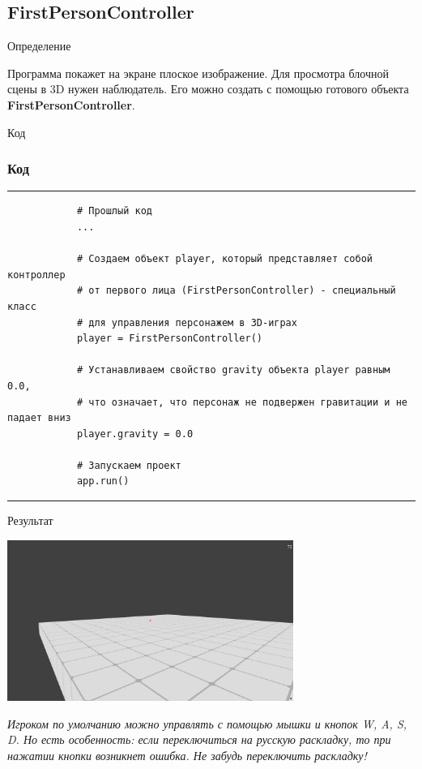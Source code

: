 \documentclass[handout]{beamer}
\begin{document}
    \subsection{FirstPersonController}
    \begin{frame}{Определение}
        \begin{justify}
            Программа покажет на экране плоское изображение. Для просмотра блочной сцены в 3D нужен наблюдатель. Его можно создать с помощью готового объекта \textbf{FirstPersonController}.
        \end{justify}
    \end{frame}

    \begin{frame}[fragile]{Код}
        \frametitle{Код}
        \scriptsize
        \rule{\textwidth}{1pt}
        \begin{verbatim}
            # Прошлый код
            ...
            
            # Создаем объект player, который представляет собой контроллер 
            # от первого лица (FirstPersonController) - специальный класс 
            # для управления персонажем в 3D-играх
            player = FirstPersonController()
            
            # Устанавливаем свойство gravity объекта player равным 0.0, 
            # что означает, что персонаж не подвержен гравитации и не падает вниз
            player.gravity = 0.0
            
            # Запускаем проект
            app.run()
        \end{verbatim}
        \rule{\textwidth}{1pt}
    \end{frame}
    
    \begin{frame}{Результат}
        \begin{center}
            \includegraphics[width=0.7\textwidth]{img/3.png}
        \end{center}
        \begin{justify}
            \textit{Игроком по умолчанию можно управлять с помощью мышки и кнопок W, A, S, D. Но есть особенность: если переключиться на русскую раскладку, то при нажатии кнопки возникнет ошибка. Не забудь переключить раскладку!}
        \end{justify}
    \end{frame}
\end{document}
